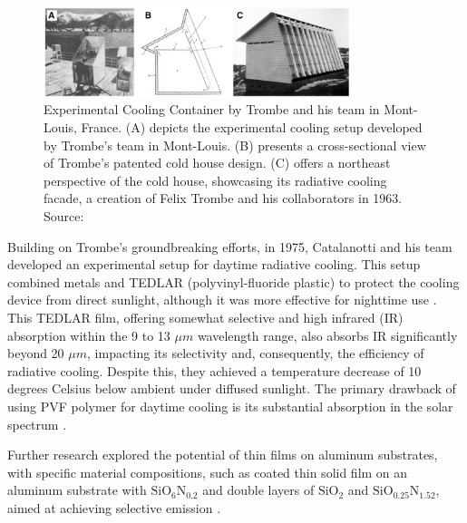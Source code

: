 \begin{figure}[ht!]
  \centering
  \includegraphics[width=0.8\textwidth]{Chapters/Figures/Chapter 1 Figures/Trombe PDRC Structure.png}
  \caption[Experimental Cooling Container by Trombe et al.]{Experimental Cooling Container by Trombe and his team in Mont-Louis, France. (A) depicts the experimental cooling setup developed by Trombe's team in Mont-Louis. (B) presents a cross-sectional view of Trombe’s patented cold house design. (C) offers a northeast perspective of the cold house, showcasing its radiative cooling facade, a creation of Felix Trombe and his collaborators in 1963. Source: \cite{fortin_passive_2023}}
  \label{fig:Trombe_cooling_house}
\end{figure}

Building on Trombe's groundbreaking efforts, in 1975, Catalanotti and his team developed an experimental setup for daytime radiative cooling. This setup combined metals and TEDLAR (polyvinyl-fluoride plastic) to protect the cooling device from direct sunlight, although it was more effective for nighttime use \cite{bijarniya_review_2020}. This TEDLAR film, offering somewhat selective and high infrared (IR) absorption within the 9 to 13 $\mu m$ wavelength range, also absorbs IR significantly beyond 20 $\mu m$, impacting its selectivity and, consequently, the efficiency of radiative cooling. Despite this, they achieved a temperature decrease of 10 degrees Celsius below ambient under diffused sunlight. The primary drawback of using PVF polymer for daytime cooling is its substantial absorption in the solar spectrum \cite{hossain_radiative_2016}.

Further research explored the potential of thin films on aluminum substrates, with specific material compositions, such as coated thin solid film on an aluminum substrate with $\text{SiO}_6\text{N}_{0.2}$ and double layers of $\text{SiO}_2$ and $\text{SiO}_{0.25}\text{N}_{1.52}$, aimed at achieving selective emission \cite{bijarniya_review_2020}.

